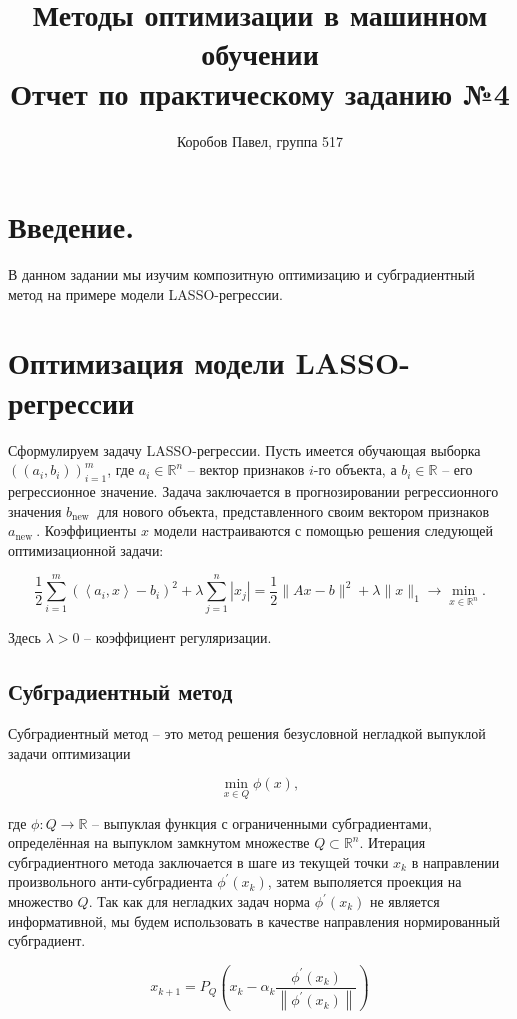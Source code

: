 \documentclass[11pt]{article}
\title{Методы оптимизации в машинном обучении \\
Отчет по практическому заданию №4}
\author{Коробов Павел, группа 517}
\begin{document}
\maketitle
\thispagestyle{empty}

\section{Введение.}
В данном задании мы изучим композитную оптимизацию и субградиентный метод на примере модели LASSO-регрессии.

\section{Оптимизация модели LASSO-регрессии}
Сформулируем задачу LASSO-регрессии. 
Пусть имеется обучающая выборка 
$\left(\left(a_{i}, b_{i}\right)\right)_{i=1}^{m}$, где $a_{i} \in \mathbb{R}^{n}$ -- вектор признаков $i$-го объекта, а $b_{i} \in \mathbb{R}$ -- его регрессионное значение.
Задача заключается в прогнозировании регрессионного значения $b_{\text {new }}$ для нового объекта, представленного своим вектором признаков $a_{\text {new }}$.
Коэффициенты $x$ модели настраиваются с помощью решения следующей оптимизационной задачи:

$$\frac{1}{2} \sum_{i=1}^{m}\left(\left\langle a_{i}, x\right\rangle-b_{i}\right)^{2}+\lambda \sum_{j=1}^{n}\left|x_{j}\right|= \frac{1}{2}\|A x-b\|^{2}+\lambda\|x\|_{1} \rightarrow \min _{x \in \mathbb{R}^{n}}.$$

Здесь $\lambda > 0$ -- коэффициент регуляризации.

 \subsection{Субградиентный метод}
Субградиентный метод -- это метод решения безусловной негладкой выпуклой задачи оптимизации

$$
\min _{x \in Q} \phi(x),
$$

где $\phi: Q \rightarrow \mathbb{R}$ -- выпуклая функция с ограниченными субградиентами, определённая на выпуклом замкнутом 	множестве $Q \subset \mathbb{R}^n$. Итерация субградиентного метода заключается в шаге из текущей точки $x_k$ в направлении  произвольного анти-субградиента $\phi^\prime (x_k)$, затем выполяется проекция на множество $Q$. Так как для негладких задач норма $\phi^\prime (x_k)$ не является информативной, мы будем использовать в качестве направления нормированный субградиент.

$$
x_{k+1}=P_{Q}\left(x_{k}-\alpha_{k} \frac{\phi^{\prime}\left(x_{k}\right)}{\left\|\phi^{\prime}\left(x_{k}\right)\right\|}\right)
$$
\end{document}
